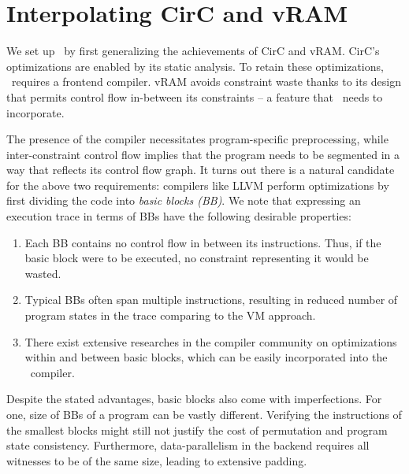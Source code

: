 \section{Interpolating CirC and vRAM} \label{sec:framework}

We set up \CoBBl~by first generalizing the achievements of CirC and vRAM. CirC's optimizations are enabled by its static analysis. To retain these optimizations, \CoBBl~requires a frontend compiler. vRAM avoids constraint waste thanks to its design that permits control flow in-between its constraints -- a feature that \CoBBl~needs to incorporate.

The presence of the compiler necessitates program-specific preprocessing, while inter-constraint control flow implies that the program needs to be segmented in a way that reflects its control flow graph. It turns out there is a natural candidate for the above two requirements: compilers like LLVM \cite{lattner02llvm} perform optimizations by first dividing the code into \emph{basic blocks (BB)}. We note that expressing an execution trace in terms of BBs have the following desirable properties:
\begin{enumerate}
    \item Each BB contains no control flow in between its instructions. Thus, if the basic block were to be executed, no constraint representing it would be wasted.
    \item Typical BBs often span multiple instructions, resulting in reduced number of program states in the trace comparing to the VM approach.
    \item There exist extensive researches in the compiler community \cite{sui16svf, lee18recon} on optimizations within and between basic blocks, which can be easily incorporated into the \CoBBl~compiler.
\end{enumerate}

Despite the stated advantages, basic blocks also come with imperfections. For one, size of BBs of a program can be vastly different. Verifying the instructions of the smallest blocks might still not justify the cost of permutation and program state consistency. Furthermore, data-parallelism in the backend requires all witnesses to be of the same size, leading to extensive padding.


